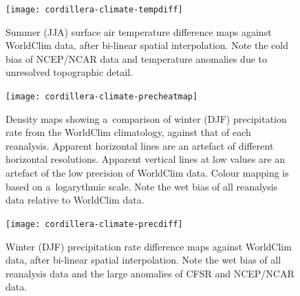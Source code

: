 \documentclass[tc, ms]{copernicus}
\begin{document}
\begin{figure}
  \texttt{[image: cordillera-climate-tempdiff]}
  \caption{Summer (JJA) surface air temperature difference maps against WorldClim data, after bi-linear spatial interpolation. Note the cold bias of NCEP/NCAR data and temperature anomalies due to unresolved topographic detail.}
  \label{fig:tempdiff}
\end{figure}

\begin{figure}
  \texttt{[image: cordillera-climate-precheatmap]}
  \caption{Density maps showing a~comparison of winter (DJF) precipitation rate from the WorldClim climatology, against that of each reanalysis. Apparent horizontal lines are an artefact of different horizontal resolutions. Apparent vertical lines at low values are an artefact of the low precision of WorldClim data. Colour mapping is based on a~logarythmic scale. Note the wet bias of all reanalysis data relative to WorldClim data.}
  \label{fig:precheatmap}
\end{figure}

\begin{figure}
  \texttt{[image: cordillera-climate-precdiff]}
  \caption{Winter (DJF) precipitation rate difference maps against WorldClim data, after bi-linear spatial interpolation. Note the wet bias of all reanalysis data and the large anomalies of CFSR and NCEP/NCAR data.}
  \label{fig:precdiff}
\end{figure}
\end{document}
